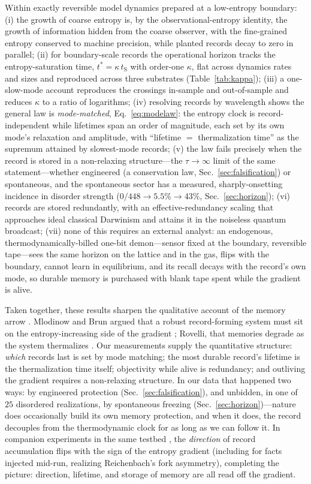\documentclass[aps,pre,twocolumn,superscriptaddress,nofootinbib,longbibliography]{revtex4-2}
\newcommand{\tS}{t_{\mathrm{S}}}
\newcommand{\tstar}{t^{*}}
\newcommand{\kap}{\kappa}
\begin{document}
Within exactly reversible model dynamics prepared at a low-entropy boundary: (i) the growth
of coarse entropy is, by the observational-entropy identity, the growth of information
hidden from the coarse observer, with the fine-grained entropy conserved to machine
precision, while planted records decay to zero in parallel; (ii) for boundary-scale
records the operational horizon tracks the entropy-saturation time, $\tstar=\kap\,\tS$
with order-one $\kap$, flat across dynamics rates and sizes and reproduced across three
substrates (Table~\ref{tab:kappa}); (iii) a one-slow-mode account reproduces the crossings
in-sample and out-of-sample and reduces $\kap$ to a ratio of logarithms; (iv) resolving
records by wavelength shows the general law is \emph{mode-matched},
Eq.~\eqref{eq:modelaw}: the entropy clock is record-independent while lifetimes span an
order of magnitude, each set by its own mode's relaxation and amplitude, with
``lifetime $=$ thermalization time'' as the supremum attained by slowest-mode records;
(v) the law fails precisely when the record is stored in a non-relaxing structure---the
$\tau\to\infty$ limit of the same statement---whether engineered (a conservation law,
Sec.~\ref{sec:falsification}) or spontaneous, and the spontaneous sector has a measured,
sharply-onsetting incidence in disorder strength ($0/448\to5.5\%\to43\%$,
Sec.~\ref{sec:horizon}); (vi) records are stored redundantly, with an
effective-redundancy scaling that approaches ideal classical Darwinism and attains it in
the noiseless quantum broadcast; (vii) none of this requires an external analyst: an
endogenous, thermodynamically-billed one-bit demon---sensor fixed at the boundary,
reversible tape---sees the same horizon on the lattice and in the gas, flips with the
boundary, cannot learn in equilibrium, and its recall decays with the record's own mode,
so durable memory is purchased with blank tape spent while the gradient is alive.

Taken together, these results sharpen the qualitative account of the memory arrow
\cite{reichenbach1956,wolpert1992,mlodinowbrun2014,rovelli2020memory}. Mlodinow and Brun
argued that a robust record-forming system must sit on the entropy-increasing side of the
gradient \cite{mlodinowbrun2014}; Rovelli, that memories degrade as the system thermalizes
\cite{rovelli2020memory}. Our measurements supply the quantitative structure: \emph{which}
records last is set by mode matching; the most durable record's lifetime is the
thermalization time itself; objectivity while alive is redundancy; and outliving the
gradient requires a non-relaxing structure. In our data that happened two ways: by
engineered protection (Sec.~\ref{sec:falsification}), and unbidden, in one of $25$
disordered realizations, by spontaneous freezing (Sec.~\ref{sec:horizon})---nature does
occasionally build its own memory protection, and when it does, the record decouples from
the thermodynamic clock for as long as we can follow it. In companion experiments in the same testbed \cite{repo}, the
\emph{direction} of record accumulation flips with the sign of the entropy gradient
(including for facts injected mid-run, realizing Reichenbach's fork asymmetry), completing
the picture: direction, lifetime, and storage of memory are all read off the gradient.
\end{document}
